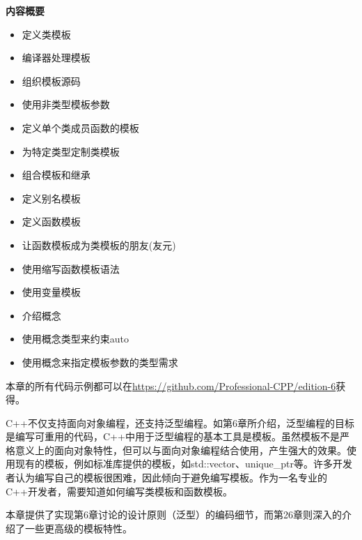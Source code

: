 \noindent
\textbf{内容概要}

\begin{itemize}
\item
定义类模板

\item
编译器处理模板

\item
组织模板源码

\item
使用非类型模板参数

\item
定义单个类成员函数的模板

\item
为特定类型定制类模板

\item
组合模板和继承

\item
定义别名模板

\item
定义函数模板

\item
让函数模板成为类模板的朋友(友元)

\item
使用缩写函数模板语法

\item
使用变量模板

\item
介绍概念

\item
使用概念类型来约束auto

\item
使用概念来指定模板参数的类型需求
\end{itemize}

本章的所有代码示例都可以在\url{https://github.com/Professional-CPP/edition-6}获得。

C++不仅支持面向对象编程，还支持泛型编程。如第6章所介绍，泛型编程的目标是编写可重用的代码，C++中用于泛型编程的基本工具是模板。虽然模板不是严格意义上的面向对象特性，但可以与面向对象编程结合使用，产生强大的效果。使用现有的模板，例如标准库提供的模板，如std::vector、unique\_ptr等。许多开发者认为编写自己的模板很困难，因此倾向于避免编写模板。作为一名专业的C++开发者，需要知道如何编写类模板和函数模板。

本章提供了实现第6章讨论的设计原则（泛型）的编码细节，而第26章则深入的介绍了一些更高级的模板特性。



















